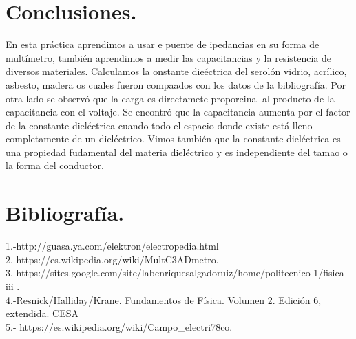 \documentclass[11pt,a4paper]{article}
\begin{document}
\section{Conclusiones.}
En esta pr\'{a}ctica aprendimos a usar e puente de ipedancias en su forma de mult\'{i}metro, tambi\'{e}n aprendimos a medir las capacitancias y la resistencia de diversos materiales. Calculamos la onstante die\'{e}ctrica del serol\'{o}n vidrio, acr\'{i}lico, asbesto, madera os cuales fueron compaados con los datos de la bibliograf\'{i}a. Por otra lado se observ\'{o} que la carga es directamete proporcinal al producto de la capacitancia con el voltaje. Se encontr\'{o} que la capacitancia aumenta por el factor de la constante diel\'{e}ctrica cuando todo el espacio donde existe est\'{a} lleno completamente de un diel\'{e}ctrico. Vimos tambi\'{e}n que la constante diel\'{e}ctrica es una propiedad fudamental del materia diel\'{e}ctrico y es independiente del tamao o la forma del conductor. 
 \section{Bibliograf\'{i}a.}
1.-http://guasa.ya.com/elektron/electropedia.html\\
2.-https://es.wikipedia.org/wiki/MultC3ADmetro.\\
3.-https://sites.google.com/site/labenriquesalgadoruiz/home/politecnico-1/fisica-iii .\\
4.-Resnick/Halliday/Krane. Fundamentos de F\'{i}sica. Volumen 2. Edici\'{o}n 6, extendida. CESA\\
5.- https://es.wikipedia.org/wiki/Campo_electri78co.\\

\end{document}
